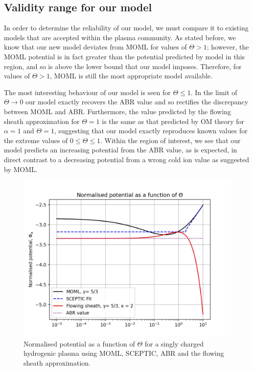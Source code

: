 \documentclass{article}
\begin{document}
\subsection{Validity range for our model}

\smallskip

In order to determine the reliability of our model, we must compare it to existing 
models that are accepted within the plasma community. As stated before, we know that 
our new model deviates from MOML for values of $\Theta > 1$; however, the MOML potential 
is in fact greater than the potential predicted by model in this region, and so is above
the lower bound that our model imposes. Therefore, for values of $\Theta > 1$, MOML is still the most
appropriate model available. 

\medskip

The most interesting behaviour of our model is seen for $\Theta \leq 1$. In the limit of 
$\Theta \to 0$ our model exactly recovers the ABR value and so rectifies the discrepancy between
MOML and ABR. Furthermore, the value predicted by the flowing sheath approximation for 
$\Theta = 1$ is the same as that predicted by OM theory for $\alpha = 1$ and $\Theta = 1$, suggesting 
that our model exactly reproduces known values for the extreme values of $0 \leq \Theta \leq 1$.
Within the region of interest, we see that our model predicts an 
increasing potential from the ABR value, as is expected, in direct contrast to a decreasing potential from a 
wrong cold ion value as suggested by MOML.

\begin{figure}[H]
\centering
\includegraphics[width=\linewidth]{Output/ModelComparions.jpeg}
\caption{Normalised potential as a function of $\Theta$ for a singly charged hydrogenic plasma using MOML, SCEPTIC,
ABR and the flowing sheath approximation.}
\label{ModelComparions} 
\end{figure}
\end{document}
